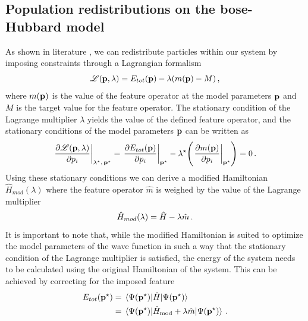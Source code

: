 \documentclass[twoside,twocolumn,9pt]{article}
\begin{document}
\subsection{Population redistributions on the bose-Hubbard model}
As shown in literature \cite{devriendt2021, devriendt2022}, we can redistribute particles within our system by imposing constraints through a Lagrangian formalism \cite{mukherji1963, zeiss1983, kaduk2011}
\begin{equation}
  \mathscr{L}(\vb{p}, \lambda)
        = E_{tot}(\vb{p})
        - \lambda ( m(\vb{p}) - M )
        \thinspace ,
\end{equation} 
where $m(\vb{p})$ is the value of the feature operator at the model parameters $\vb{p}$ and $M$ is the target value for the feature operator. The stationary condition of the Lagrange multiplier $\lambda$ yields the value of the defined feature operator, and the stationary conditions of the model parameters $\vb{p}$ can be written as
\begin{equation}
  \eval{
    \pdv{
        \mathscr{L}(\vb{p}, \lambda)
    }{p_i}
}_{\lambda^\star, \thinspace \vb{p}^\star}
= \eval{
    \pdv{
        E_{tot}(\vb{p})
    }{p_i}
}_{\vb{p}^\star}
- \lambda^\star \qty( 
    \eval{
        \pdv{
            m(\vb{p})
        }{p_i}
    }_{\vb{p}^\star}
)
= 0
\thinspace .
\label{eq:stationary_condition_model_parameters}
\end{equation}
Using these stationary conditions we can derive a modified Hamiltonian $\hat{H}_{mod}(\lambda)$ where the feature operator $\hat{m}$ is weighed by the value of the Lagrange multiplier
\begin{equation}
  \hat{H}_{mod}(\lambda) = \hat{H} - \lambda \hat{m} \thinspace .
  \label{eq:modified-hamiltonian}
\end{equation}
It is important to note that, while the modified Hamiltonian is suited to optimize the model parameters of the wave function in such a way that the stationary condition of the Lagrange multiplier is satisfied, the energy of the system needs to be calculated using the original Hamiltonian of the system. This can be achieved by correcting for the imposed feature
\begin{align}
  \begin{split}
    E_{tot}(\vb{p}^\star)
    &= \ev*{\hat{H}}{\Psi(\vb{p}^\star)} \\ 
    &= \ev*{\hat{H}_{\text{mod}} + \lambda\hat{m}}{\Psi(\vb{p}^\star)}
    \thinspace .
  \end{split}
\end{align}
\end{document}
